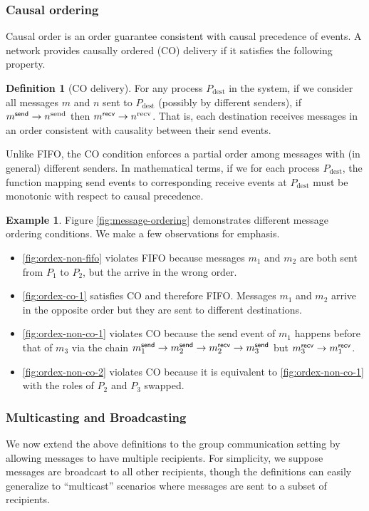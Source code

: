 \documentclass[]             %
{NASA}                       %
\theoremstyle{definition}
\newtheorem{example}[theorem]{Example}
\newtheorem{definition}[theorem]{Definition}
\providecommand{\tightlist}{%
  \setlength{\itemsep}{0pt}\setlength{\parskip}{0pt}}
\begin{document}
\subsubsection{Causal ordering}
Causal order is an order guarantee consistent with causal precedence
of events. A network provides causally ordered (CO) delivery if it
satisfies the following property.
\begin{definition}[CO delivery]
  \label{def:causalorder}
  For any process $P_\mathrm{dest}$ in the system, if we consider all
  messages $m$ and $n$ sent to $P_\mathrm{dest}$ (possibly by
  different senders), if $m_{}^{\mathsf{send}} \to n^\textrm{send}$ then
  $m_{}^{\mathsf{recv}} \to n^\textrm{recv}$. That is, each destination receives
  messages in an order consistent with causality between their send
  events.
\end{definition}
Unlike FIFO, the CO condition enforces a partial order among messages
with (in general) different senders. In mathematical terms, if we for
each process $P_{\mathrm{dest}}$, the function mapping send events to
corresponding receive events at $P_{\mathrm{dest}}$ must be monotonic
with respect to causal precedence.

\begin{example}
  Figure \ref{fig:message-ordering} demonstrates different message
  ordering conditions. We make a few observations for emphasis.

  \begin{itemize}
    \tightlist
  \item \ref{fig:ordex-non-fifo} violates FIFO because messages $m_1$
    and $m_2$ are both sent from $P_1$ to $P_2$, but the arrive in the wrong order.
  \item \ref{fig:ordex-co-1} satisfies CO and therefore FIFO. Messages
    $m_1$ and $m_2$ arrive in the opposite order but they are sent to
    different destinations.
  \item \ref{fig:ordex-non-co-1} violates CO because the send event of
    $m_1$ happens before that of $m_3$ via the chain
    $m_{1}^{\mathsf{send}} \to m_{2}^{\mathsf{send}} \to m_{2}^{\mathsf{recv}} \to m_{3}^{\mathsf{send}}$ but
    $m_{3}^{\mathsf{recv}} \to m_{1}^{\mathsf{recv}}$.
  \item \ref{fig:ordex-non-co-2} violates CO because it is equivalent to
    \ref{fig:ordex-non-co-1} with the roles of $P_2$ and $P_3$ swapped.
  \end{itemize}
\end{example}

\subsubsection{Multicasting and Broadcasting}
\label{sssec:multicasting}
We now extend the above definitions to the group communication setting
by allowing messages to have multiple recipients. For simplicity, we
suppose messages are broadcast to all other recipients, though the
definitions can easily generalize to ``multicast'' scenarios where
messages are sent to a subset of recipients.
\end{document}
